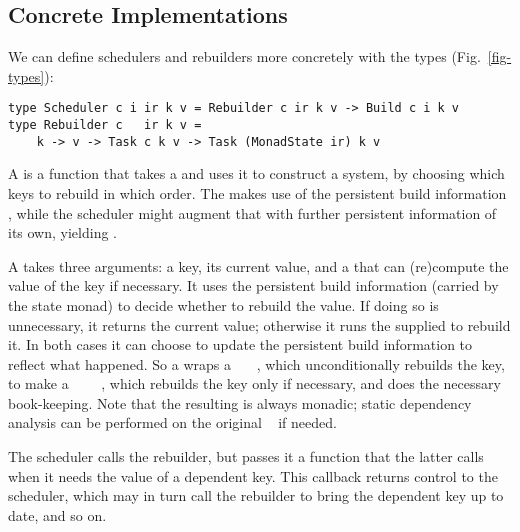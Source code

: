 \subsection{Concrete Implementations}

We can define schedulers and rebuilders more concretely with the types (Fig.~\ref{fig-types}):

\vspace{0.5mm}
\begin{verbatim}
type Scheduler c i ir k v = Rebuilder c ir k v -> Build c i k v
type Rebuilder c   ir k v =
    k -> v -> Task c k v -> Task (MonadState ir) k v
\end{verbatim}
\vspace{0.5mm}

\noindent
A  is a function that takes a  and uses
it to construct a  system, by choosing which keys to rebuild in which
order. The  makes use of the persistent build information
, while the scheduler might augment that with further persistent
information of its own, yielding .

A  takes three arguments: a key, its current value, and a
 that can (re)compute the value of the key if necessary. It uses the
persistent build information  (carried by the state monad) to decide
whether to rebuild the value. If doing so is unnecessary, it returns the current
value; otherwise it runs the supplied  to rebuild it. In both cases it
can choose to update the persistent build information  to reflect what
happened. So a  wraps a ~~~, which
unconditionally rebuilds the key, to make a
~~~~, which rebuilds the key only
if necessary, and does the necessary book-keeping. Note that the resulting
 is always monadic; static dependency analysis can be performed on the
original ~ if needed.

The scheduler calls the rebuilder, but passes it a  function
that the latter calls when it needs the value of a dependent key.  This
callback returns control to the scheduler, which may in turn call the
rebuilder to bring the dependent key up to date, and so on.

